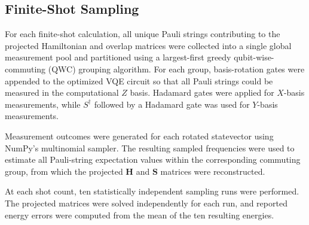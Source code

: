 \SpinExpectationShortenedBasisEquation


\subsection{Finite-Shot Sampling}
\label{sec:si-finite-shot-sampling}
For each finite-shot calculation, all unique Pauli strings contributing to the projected Hamiltonian and overlap matrices were collected into a single global measurement pool and partitioned using a largest-first greedy qubit-wise-commuting (QWC) grouping algorithm. 
For each group, basis-rotation gates were appended to the optimized VQE circuit so that all Pauli strings could be measured in the computational $Z$ basis. 
Hadamard gates were applied for $X$-basis measurements, while $S^{\dagger}$ followed by a Hadamard gate was used for $Y$-basis measurements.

Measurement outcomes were generated for each rotated statevector using NumPy's multinomial sampler. 
The resulting sampled frequencies were used to estimate all Pauli-string expectation values within the corresponding commuting group, from which the projected $\mathbf{H}$ and $\mathbf{S}$ matrices were reconstructed.

At each shot count, ten statistically independent sampling runs were performed. 
The projected matrices were solved independently for each run, and reported energy errors were computed from the mean of the ten resulting energies.